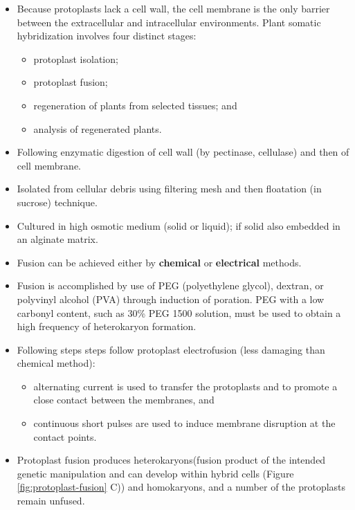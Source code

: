 \documentclass[
  ignorenonframetext,
  aspectratio=169]{beamer}
\providecommand{\tightlist}{%
  \setlength{\itemsep}{0pt}\setlength{\parskip}{0pt}}
\begin{document}
\begin{frame}{}
\protect\hypertarget{section-11}{}
\footnotesize

\begin{itemize}
\tightlist
\item
  Because protoplasts lack a cell wall, the cell membrane is the only
  barrier between the extracellular and intracellular environments.
  Plant somatic hybridization involves four distinct stages:

  \begin{itemize}
  \tightlist
  \item
    protoplast isolation;
  \item
    protoplast fusion;
  \item
    regeneration of plants from selected tissues; and
  \item
    analysis of regenerated plants.
  \end{itemize}
\item
  Following enzymatic digestion of cell wall (by pectinase, cellulase)
  and then of cell membrane.
\item
  Isolated from cellular debris using filtering mesh and then floatation
  (in sucrose) technique.
\item
  Cultured in high osmotic medium (solid or liquid); if solid also
  embedded in an alginate matrix.
\item
  Fusion can be achieved either by \textbf{chemical} or
  \textbf{electrical} methods.
\item
  Fusion is accomplished by use of PEG (polyethylene glycol), dextran,
  or polyvinyl alcohol (PVA) through induction of poration. PEG with a
  low carbonyl content, such as 30\% PEG 1500 solution, must be used to
  obtain a high frequency of heterokaryon formation.
\end{itemize}
\end{frame}

\begin{frame}{}
\protect\hypertarget{section-12}{}
\begin{itemize}
\tightlist
\item
  Following steps steps follow protoplast electrofusion (less damaging
  than chemical method):

  \begin{itemize}
  \tightlist
  \item
    alternating current is used to transfer the protoplasts and to
    promote a close contact between the membranes, and
  \item
    continuous short pulses are used to induce membrane disruption at
    the contact points.
  \end{itemize}
\item
  Protoplast fusion produces heterokaryons(fusion product of the
  intended genetic manipulation and can develop within hybrid cells
  (Figure \ref{fig:protoplast-fusion} C)) and homokaryons, and a number
  of the protoplasts remain unfused.
\end{itemize}
\end{frame}
\end{document}
